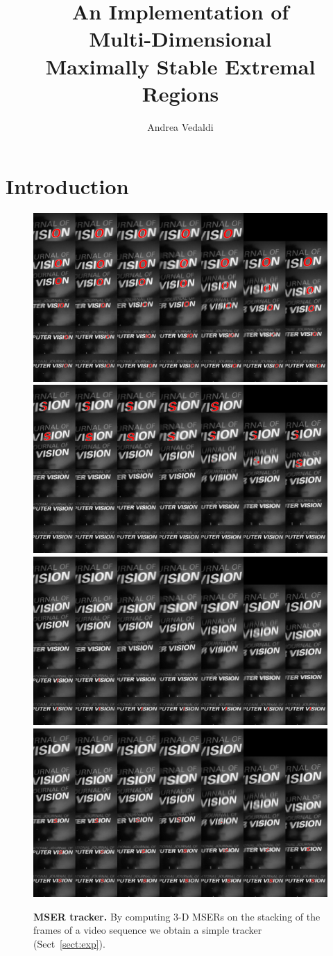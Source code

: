 \documentclass{article}
\title{An Implementation of\\
Multi-Dimensional \\ Maximally Stable Extremal Regions}
\author{Andrea Vedaldi}
\begin{document}
\maketitle{}

\tableofcontents{}

\section{Introduction}\label{sect:intro}

\begin{figure}
\begin{center}
\includegraphics[width=.498\textwidth]{figures/region-148.png}\hfill %
\includegraphics[width=.498\textwidth]{figures/region-211.png}\\
\includegraphics[width=.498\textwidth]{figures/region-121.png}\hfill %
\includegraphics[width=.498\textwidth]{figures/region-111.png}\\
\end{center}
\caption{{\bf MSER tracker.} By computing 3-D MSERs on the stacking of the frames of a video sequence we obtain a simple tracker (Sect~\ref{sect:exp}).}
\label{fig:exp.ok}
\end{figure}
\end{document}
